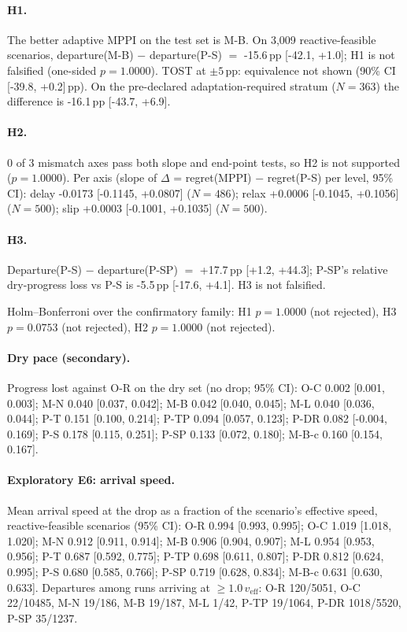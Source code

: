 \paragraph{H1.} The better adaptive MPPI on the test set is M-B. On 3,009 reactive-feasible scenarios, departure(M-B) $-$ departure(P-S) $=$ -15.6\,pp [-42.1, +1.0]; H1 is not falsified (one-sided $p=1.0000$). TOST at $\pm5$\,pp: equivalence not shown (90\% CI [-39.8, +0.2]\,pp).
 On the pre-declared adaptation-required stratum ($N=363$) the difference is -16.1\,pp [-43.7, +6.9].


\paragraph{H2.} 0 of 3 mismatch axes pass both slope and end-point tests, so H2 is not supported ($p=1.0000$). Per axis (slope of $\Delta$ = regret(MPPI) $-$ regret(P-S) per level, 95\% CI): delay -0.0173 [-0.1145, +0.0807] ($N=486$); relax +0.0006 [-0.1045, +0.1056] ($N=500$); slip +0.0003 [-0.1001, +0.1035] ($N=500$).

\paragraph{H3.} Departure(P-S) $-$ departure(P-SP) $=$ +17.7\,pp [+1.2, +44.3]; P-SP's relative dry-progress loss vs P-S is -5.5\,pp [-17.6, +4.1]. H3 is not falsified.

Holm--Bonferroni over the confirmatory family: H1 $p=1.0000$ (not rejected), H3 $p=0.0753$ (not rejected), H2 $p=1.0000$ (not rejected).

\paragraph{Dry pace (secondary).} Progress lost against O-R on the dry set (no drop; 95\% CI): O-C 0.002 [0.001, 0.003]; M-N 0.040 [0.037, 0.042]; M-B 0.042 [0.040, 0.045]; M-L 0.040 [0.036, 0.044]; P-T 0.151 [0.100, 0.214]; P-TP 0.094 [0.057, 0.123]; P-DR 0.082 [-0.004, 0.169]; P-S 0.178 [0.115, 0.251]; P-SP 0.133 [0.072, 0.180]; M-B-c 0.160 [0.154, 0.167].

\paragraph{Exploratory E6: arrival speed.} Mean arrival speed at the drop as a fraction of the scenario's effective speed, reactive-feasible scenarios (95\% CI): O-R 0.994 [0.993, 0.995]; O-C 1.019 [1.018, 1.020]; M-N 0.912 [0.911, 0.914]; M-B 0.906 [0.904, 0.907]; M-L 0.954 [0.953, 0.956]; P-T 0.687 [0.592, 0.775]; P-TP 0.698 [0.611, 0.807]; P-DR 0.812 [0.624, 0.995]; P-S 0.680 [0.585, 0.766]; P-SP 0.719 [0.628, 0.834]; M-B-c 0.631 [0.630, 0.633].
 Departures among runs arriving at $\geq 1.0\,v_\mathrm{eff}$: O-R 120/5051, O-C 22/10485, M-N 19/186, M-B 19/187, M-L 1/42, P-TP 19/1064, P-DR 1018/5520, P-SP 35/1237.


